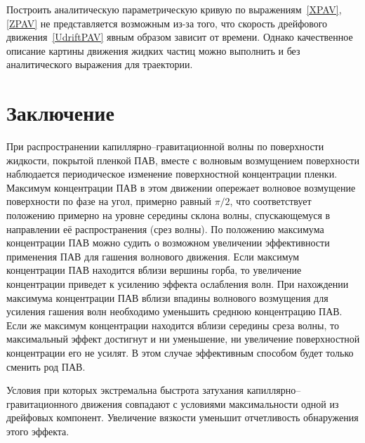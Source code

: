 Построить аналитическую параметрическую кривую по выражениям~\eqref{XPAV}, \eqref{ZPAV} не представляется возможным из-за того, что скорость дрейфового движения~\eqref{UdriftPAV} явным образом зависит от времени. Однако качественное описание картины движения жидких частиц можно выполнить и без аналитического выражения для траектории.



\section{Заключение}
  
При распространении капиллярно--гравитационной волны по поверхности жидкости, покрытой пленкой ПАВ, вместе с волновым возмущением поверхности наблюдается периодическое изменение поверхностной концентрации пленки. Максимум концентрации ПАВ в этом движении опережает волновое возмущение поверхности по фазе на угол, примерно равный $ \pi/2 $, что соответствует положению примерно на уровне середины склона волны, спускающемуся в направлении её распространения (срез волны). По положению максимума концентрации ПАВ можно судить о возможном увеличении эффективности применения ПАВ для гашения волнового движения. Если максимум  концентрации ПАВ находится вблизи вершины горба, то увеличение концентрации приведет к усилению эффекта ослабления волн. При нахождении максимума концентрации ПАВ вблизи впадины волнового возмущения для усиления гашения волн необходимо уменьшить среднюю концентрацию ПАВ. Если же максимум концентрации находится вблизи середины среза волны, то максимальный эффект достигнут и ни уменьшение, ни увеличение поверхностной концентрации его не усилят. В этом случае эффективным способом будет только сменить род ПАВ.

Условия при которых экстремальна быстрота затухания капиллярно--гравитационного движения совпадают с условиями максимальности одной из дрейфовых компонент. Увеличение вязкости уменьшит отчетливость обнаружения этого эффекта. 